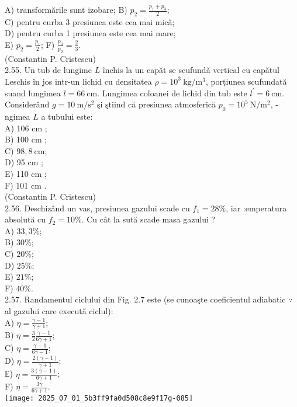 A) transformările sunt izobare; B) $p_{2}=\frac{p_{1}+p_{3}}{2}$;\\
C) pentru curba 3 presiunea este cea mai mică;\\
D) pentru curba 1 presiunea este cea mai mare;\\
E) $p_{2}=\frac{p_{1}}{2}$; F) $\frac{p_{3}}{p_{2}}=\frac{2}{3}$.\\
(Constantin P. Cristescu)\\
2.55. Un tub de lungime $L$ închis la un capăt se scufundǎ vertical cu capătul Leschis în jos intr-un lichid cu densitatea $\rho=10^{3} \mathrm{~kg} / \mathrm{m}^{3}$, porțiunea scufundată suand lungimea $l=66 \mathrm{~cm}$. Lungimea coloanei de lichid din tub este $l^{\prime}=6 \mathrm{~cm}$. Considerând $g=10 \mathrm{~m} / \mathrm{s}^{2}$ şi ştiind că presiunea atmosferică $p_{0}=10^{5} \mathrm{~N} / \mathrm{m}^{2}$, -ngimea $L$ a tubului este:\\
A) 106 cm ;\\
B) 100 cm ;\\
C) $98,8 \mathrm{~cm}$;\\
D) 95 cm ;\\
E) 110 cm ;\\
F) 101 cm .\\
(Constantin P. Cristescu)\\
2.56. Deschizând un vas, presiunea gazului scade cu $f_{1}=28 \%$, iar :emperatura absolută cu $f_{2}=10 \%$. Cu cât la sută scade masa gazului ?\\
A) $33,3 \%$;\\
B) $30 \%$;\\
C) $20 \%$;\\
D) $25 \%$;\\
E) $21 \%$;\\
F) $40 \%$.\\
2.57. Randamentul ciclului din Fig. 2.7 este (se cunoaşte coeficientul adiabatic $\because$ al gazului care execută ciclul):\\
A) $\eta=\frac{\gamma-1}{\gamma+1}$;\\
B) $\eta=\frac{3}{2} \frac{\gamma-1}{6 \gamma+1}$;\\
C) $\eta=\frac{\gamma-1}{6 \gamma-1}$;\\
D) $\eta=\frac{2(\gamma-1)}{\gamma+1}$;\\
Е) $\eta=\frac{3(\gamma-1)}{6 \gamma+1}$;\\
F) $\eta=\frac{3 \gamma}{6 \gamma+1}$.\\
\texttt{[image: 2025\_07\_01\_5b3ff9fa0d508c8e9f17g-085]}

